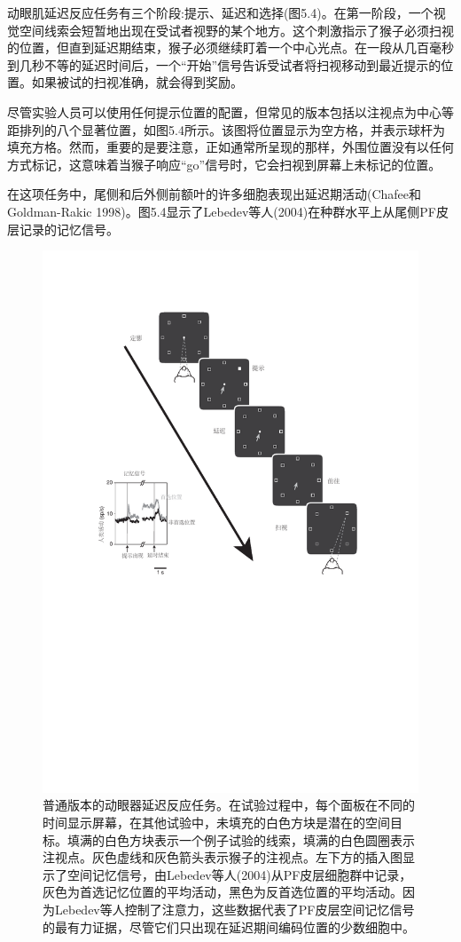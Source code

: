 动眼肌延迟反应任务有三个阶段:提示、延迟和选择(图5.4)。在第一阶段，一个视觉空间线索会短暂地出现在受试者视野的某个地方。这个刺激指示了猴子必须扫视的位置，但直到延迟期结束，猴子必须继续盯着一个中心光点。在一段从几百毫秒到几秒不等的延迟时间后，一个“开始”信号告诉受试者将扫视移动到最近提示的位置。如果被试的扫视准确，就会得到奖励。

尽管实验人员可以使用任何提示位置的配置，但常见的版本包括以注视点为中心等距排列的八个显著位置，如图5.4所示。该图将位置显示为空方格，并表示球杆为填充方格。然而，重要的是要注意，正如通常所呈现的那样，外围位置没有以任何方式标记，这意味着当猴子响应“go”信号时，它会扫视到屏幕上未标记的位置。

在这项任务中，尾侧和后外侧前额叶的许多细胞表现出延迟期活动(Chafee和Goldman-Rakic 1998)。图5.4显示了Lebedev等人(2004)在种群水平上从尾侧PF皮层记录的记忆信号。

\begin{figure}
	\centering
	\includegraphics[width=0.7\linewidth]{image_pfc/Fig_5_4}
	\caption{普通版本的动眼器延迟反应任务。在试验过程中，每个面板在不同的时间显示屏幕，在其他试验中，未填充的白色方块是潜在的空间目标。填满的白色方块表示一个例子试验的线索，填满的白色圆圈表示注视点。灰色虚线和灰色箭头表示猴子的注视点。左下方的插入图显示了空间记忆信号，由Lebedev等人(2004)从PF皮层细胞群中记录，灰色为首选记忆位置的平均活动，黑色为反首选位置的平均活动。因为Lebedev等人控制了注意力，这些数据代表了PF皮层空间记忆信号的最有力证据，尽管它们只出现在延迟期间编码位置的少数细胞中。}
	\label{fig:fig}
\end{figure}


